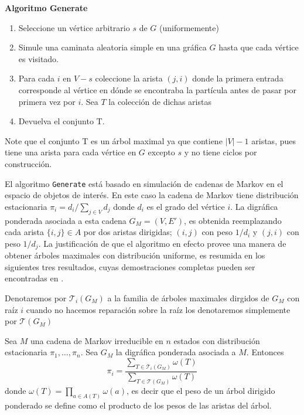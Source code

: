 \begin{cajita}
\textbf{Algoritmo Generate}
\begin{enumerate}
\item Seleccione un vértice arbitrario $s$ de $G$ (uniformemente)
\item Simule una caminata aleatoria simple en una gráfica $G$ hasta que cada vértice es visitado.
\item Para cada $i$ en $V-s$ coleccione la arista $(j,i)$ donde la primera entrada corresponde al vértice en dónde se encontraba la partícula antes de pasar por primera vez por $i$. Sea $T$ la colección de dichas aristas
\item Devuelva el conjunto T.
\end{enumerate}
\end{cajita}

Note que el conjunto T es un árbol maximal ya que contiene $|V| - 1$ aristas, pues tiene una arista para cada vértice en $G$ excepto $s$ y no tiene ciclos por construcción.

El algoritmo \texttt{Generate} está basado en simulación de cadenas de Markov en el espacio de objetos de interés. En este caso la cadena de Markov tiene distribución estacionaria $\pi_{i}=d_{i}/\sum_{j\in V} d_{j}$ donde $d_{i}$ es el grado del vértice $i$. La digráfica ponderada asociada a esta cadena $G_M =(V,E')$, es obtenida reemplazando cada arista $\{i,j\}\in A$ por dos aristas dirigidas; $(i,j)$ con peso $1/d_{i}$ y $(j,i)$ con peso $1/d_{j}$. La justificación de que el algoritmo en efecto provee una manera de obtener árboles maximales con distribución uniforme, es resumida en los siguientes tres resultados, cuyas demostraciones completas pueden ser encontradas en \cite{Broder89}.

Denotaremos por $\mathcal{T}_{i}(G_{M})$ a la familia de árboles maximales dirgidos de $G_{M}$ con raíz $i$ cuando no hacemos reparación sobre la raíz los denotaremos simplemente por $\mathcal{T}(G_{M})$ 

\begin{teo}
Sea $M$ una cadena de Markov irreducible en $n$ estados con distribución estacionaria $\pi_1, \dots, \pi_n$. Sea $G_{M}$ la digráfica ponderada asociada a $M$. Entonces
$$\pi_{i} = \frac{\sum_{ T \in \mathcal{T}_{i}(G_{M})} \omega (T)}{\sum _{T \in \mathcal{T}(G_{M})} \omega (T)}$$
donde $\omega(T) = \prod_{a\in A(T)}\omega(a)$, es decir que el peso de un árbol dirigido ponderado se define como el producto de los pesos de las aristas del árbol. 
\end{teo}

